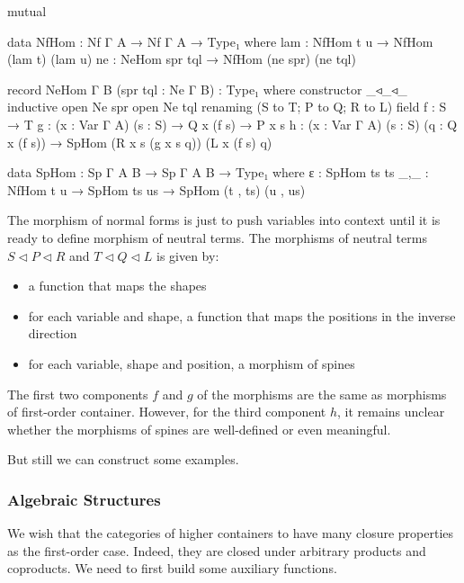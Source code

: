 \begin{code}[hide]
mutual
\end{code}

\begin{code}
  data NfHom : Nf Γ A → Nf Γ A → Type₁ where
    lam : NfHom t u → NfHom (lam t) (lam u)
    ne  : NeHom spr tql → NfHom (ne spr) (ne tql)

  record NeHom {Γ} {B} (spr tql : Ne Γ B) : Type₁ where
    constructor _◃_◃_
    inductive
    open Ne spr
    open Ne tql renaming (S to T; P to Q; R to L)
    field
      f : S → T
      g : (x : Var Γ A) (s : S) → Q x (f s) → P x s
      h : (x : Var Γ A) (s : S) (q : Q x (f s))
        → SpHom (R x s (g x s q)) (L x (f s) q)
        
  data SpHom : Sp Γ A B → Sp Γ A B → Type₁ where
    ε   : SpHom ts ts
    _,_ : NfHom t u → SpHom ts us → SpHom (t , ts) (u , us)
\end{code}

The morphism of normal forms is just to push variables into context until it is ready to define morphism of neutral terms. The morphisms of neutral terms $S \triangleleft P \triangleleft R$ and $T \triangleleft Q \triangleleft L$ is given by:

\begin{itemize}
  \item{a function that maps the shapes}
  \item{for each variable and shape, a function that maps the positions in the inverse direction}
  \item{for each variable, shape and position, a morphism of spines}
\end{itemize}

The first two components $f$ and $g$ of the morphisms are the same as morphisms of first-order container. However, for the third component $h$, it remains unclear whether the morphisms of spines are well-defined or even meaningful.

But still we can construct some examples. \hyperref[Hom]{\faCog}

\subsubsection*{Algebraic Structures}

We wish that the categories of higher containers to have many closure properties as the first-order case. Indeed, they are closed under arbitrary products and coproducts. We need to first build some auxiliary functions.

